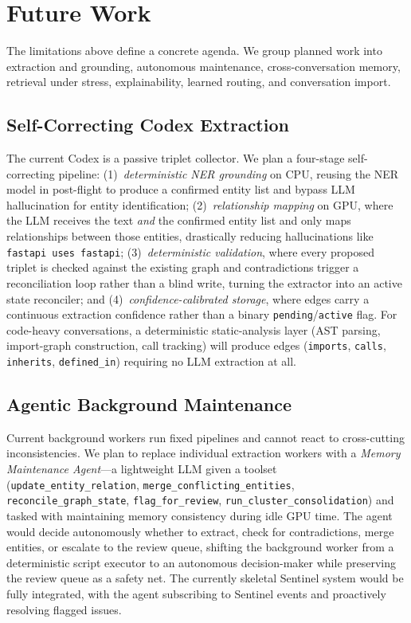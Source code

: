 \documentclass[10pt]{article}
\begin{document}
\section{Future Work}
\label{sec:future-work}

The limitations above define a concrete agenda. We group planned work into extraction and grounding, autonomous maintenance, cross-conversation memory, retrieval under stress, explainability, learned routing, and conversation import.

\subsection{Self-Correcting Codex Extraction}
The current Codex is a passive triplet collector. We plan a four-stage self-correcting pipeline: (1)~\emph{deterministic NER grounding} on CPU, reusing the NER model in post-flight to produce a confirmed entity list and bypass LLM hallucination for entity identification; (2)~\emph{relationship mapping} on GPU, where the LLM receives the text \emph{and} the confirmed entity list and only maps relationships between those entities, drastically reducing hallucinations like \texttt{fastapi uses fastapi}; (3)~\emph{deterministic validation}, where every proposed triplet is checked against the existing graph and contradictions trigger a reconciliation loop rather than a blind write, turning the extractor into an active state reconciler; and (4)~\emph{confidence-calibrated storage}, where edges carry a continuous extraction confidence rather than a binary \texttt{pending}/\texttt{active} flag. For code-heavy conversations, a deterministic static-analysis layer (AST parsing, import-graph construction, call tracking) will produce edges (\texttt{imports}, \texttt{calls}, \texttt{inherits}, \texttt{defined\_in}) requiring no LLM extraction at all.

\subsection{Agentic Background Maintenance}
Current background workers run fixed pipelines and cannot react to cross-cutting inconsistencies. We plan to replace individual extraction workers with a \emph{Memory Maintenance Agent}---a lightweight LLM given a toolset (\texttt{update\_entity\_relation}, \texttt{merge\_conflicting\_entities}, \texttt{reconcile\_graph\_state}, \texttt{flag\_for\_review}, \texttt{run\_cluster\_consolidation}) and tasked with maintaining memory consistency during idle GPU time. The agent would decide autonomously whether to extract, check for contradictions, merge entities, or escalate to the review queue, shifting the background worker from a deterministic script executor to an autonomous decision-maker while preserving the review queue as a safety net. The currently skeletal Sentinel system would be fully integrated, with the agent subscribing to Sentinel events and proactively resolving flagged issues.
\end{document}
